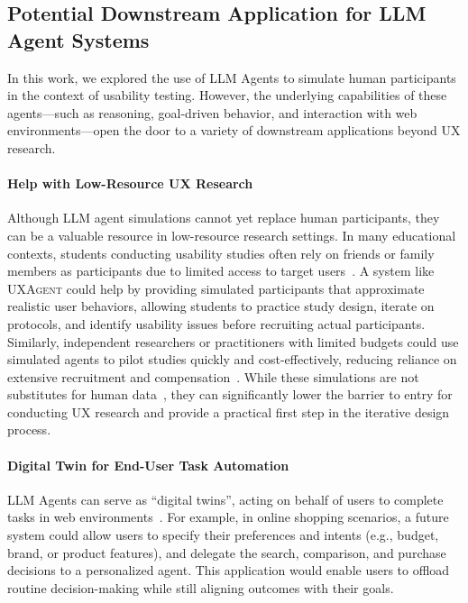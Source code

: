 \documentclass[manuscript,review,anonymous]{acmart}
\DeclareRobustCommand{\projectname}{\textsc{UXAgent}\xspace}
\begin{document}
\subsection{Potential Downstream Application for LLM Agent Systems}
In this work, we explored the use of LLM Agents to simulate human participants in the context of usability testing. However, the underlying capabilities of these agents—such as reasoning, goal-driven behavior, and interaction with web environments—open the door to a variety of downstream applications beyond UX research.

\paragraph{Help with Low-Resource UX Research}  
Although LLM agent simulations cannot yet replace human participants, they can be a valuable resource in low-resource research settings. In many educational contexts, students conducting usability studies often rely on friends or family members as participants due to limited access to target users~\cite{houde2025controlling, wang2025user}. A system like \projectname could help by providing simulated participants that approximate realistic user behaviors, allowing students to practice study design, iterate on protocols, and identify usability issues before recruiting actual participants. Similarly, independent researchers or practitioners with limited budgets could use simulated agents to pilot studies quickly and cost-effectively, reducing reliance on extensive recruitment and compensation~\cite{kapania2025simulacrum}. While these simulations are not substitutes for human data~\cite{ashkinaze2025plurals}, they can significantly lower the barrier to entry for conducting UX research and provide a practical first step in the iterative design process.  


\paragraph{Digital Twin for End-User Task Automation}
LLM Agents can serve as ``digital twins'', acting on behalf of users to complete tasks in web environments~\cite{vahdati2025multi}. For example, in online shopping scenarios, a future system could allow users to specify their preferences and intents (e.g., budget, brand, or product features), and delegate the search, comparison, and purchase decisions to a personalized agent. This application would enable users to offload routine decision-making while still aligning outcomes with their goals.
\end{document}
